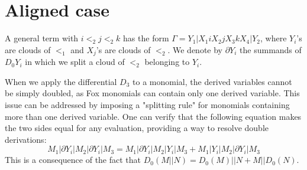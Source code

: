 \documentclass{article}[12pt]
\begin{document}
\section*{Aligned case}
 A general term with $i<_2 j <_2 k$ has the form $\Gamma = Y_1|X_1 iX_2 j X_3 k X_4 | Y_2$, where $Y_i$'s are clouds of $<_1$ and $X_j$'s are clouds of $<_2$. We denote by $\partial Y_i$ the summands of $D_0 Y_i$ in which we split a cloud of $<_2$ belonging to $Y_i$.
 
 When we apply the differential $D_3$ to a monomial, the derived variables cannot be simply doubled, as Fox monomials can contain only one derived variable. This issue can be addressed by imposing a "splitting rule" for monomials containing more than one derived variable. One can verify that the following equation makes the two sides equal for any evaluation, providing a way to resolve double derivations:
$$ M_1|\partial Y_i | M_2 | \partial Y_i |M_3 = M_1|\partial Y_i | M_2 | Y_i |M_3 + M_1|Y_i | M_2 | \partial Y_i |M_3 $$
This is a consequence of the fact that $D_0(M||N)=D_0(M)||N + M||D_0(N)$. 
\end{document}
